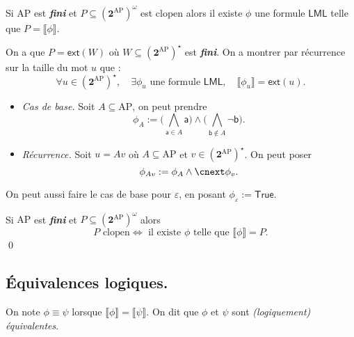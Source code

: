 \documentclass[./main]{subfiles}
\begin{document}
  \begin{prop}
    Si $\mathrm{AP}$ est \textit{\textbf{fini}} et $P \subseteq (\mathbf{2}^\mathrm{AP})^\omega$ est clopen alors il existe $\phi$ une formule $\mathsf{LML}$ telle que $P = \llbracket \phi\rrbracket$.
  \end{prop}
  \begin{prv}
    On a que $P = \mathsf{ext}(W)$ où $W \subseteq (\mathbf{2}^\mathrm{AP})^\star$ est \textit{\textbf{fini}}.
    On a montrer par récurrence sur la taille du mot $u$ que :
    \[
    \forall u \in (\mathbf{2}^\mathrm{AP})^\star, \quad \exists \phi_u \text{ une formule } \mathsf{LML}, \quad
    \llbracket \phi_u\rrbracket  = \mathsf{ext}(u)
    .\]

    \begin{itemize}
      \item \textit{Cas de base.}
        Soit $A \subseteq \mathrm{AP}$, on peut prendre 
        \[
        \phi_A := \big(\bigwedge_{\mathsf{a} \in A} \mathsf{a}\big) \land \big(\bigwedge_{\mathsf{b} \not\in A} \lnot \mathsf{b}\big)
        .\]
      \item \textit{Récurrence.}
        Soit $u = A v$ où $A \subseteq \mathrm{AP}$ et $v \in (\mathbf{2}^\mathrm{AP})^\star$.
        On peut poser 
        \[
        \phi_{A v} := \phi_A \land \nxt \phi_v
        .\]
    \end{itemize}
    On peut aussi faire le cas de base pour $\varepsilon$, en posant $\phi_{\varepsilon} := \mathsf{True}$.
  \end{prv}

  \begin{crlr}
    Si $\mathrm{AP}$ est \textit{\textbf{fini}} et $P \subseteq (\mathbf{2}^\mathrm{AP})^\omega$ alors 
    \[
    P \text{ clopen} \iff \text{ il existe $\phi$ telle que $\llbracket \phi\rrbracket  = P$}
    .\]
    \qed
  \end{crlr}

  \subsection{Équivalences logiques.}

  \begin{defn}
    On note $\phi \equiv \psi$ lorsque $\llbracket \phi\rrbracket = \llbracket \psi\rrbracket$.
    On dit que $\phi$ et $\psi$ sont \textit{(logiquement) équivalentes}.
  \end{defn}
\end{document}
